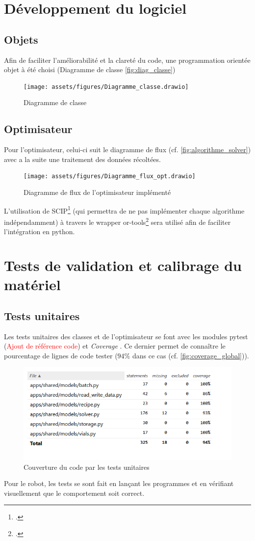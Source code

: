 \section{Développement du logiciel}
\subsection{Objets}
Afin de faciliter l'améliorabilité et la clareté du code, une programmation orientée objet à été choisi (Diagramme de classe \autoref{fig:diag_classe})
\begin{figure}[ht]
    \centering
    \texttt{[image: assets/figures/Diagramme\_classe.drawio]}
    \caption{Diagramme de classe}
    \label{fig:diag_classe}
\end{figure}
\subsection{Optimisateur}
Pour l'optimisateur, celui-ci suit le diagramme de flux (cf. \autoref{fig:algorithme_solver}) avec a la suite une traitement des données récoltées.
\begin{figure}
    \centering
    \texttt{[image: assets/figures/Diagramme\_flux\_opt.drawio]}
    \caption{Diagramme de flux de l'optimisateur implémenté}
    \label{fig:algorithme_solver}
\end{figure}
L'utilisation de SCIP\footcite{SCIP} (qui permettra de ne pas implémenter chaque algorithme indépendamment) à travers le wrapper or-tools\footcite{ORTOOLS} sera utilisé afin de faciliter l'intégration en python.

\section{Tests de validation et calibrage du matériel}
\subsection{Tests unitaires}
Les tests unitaires des classes et de l'optimisateur se font avec les modules \og pytest \fg (\textcolor{red}{Ajout de référence code}) et \og \textit{Coverage} \fg. Ce dernier permet de connaître le pourcentage de lignes de code tester ($94\%$ dans ce cas (cf. \autoref{fig:coverage_global})).
\begin{figure}[H]
    \centering
    \includegraphics[width=1\linewidth]{assets/figures/coverage.png}
    \caption{Couverture du code par les tests unitaires}
    \label{fig:coverage_global}
\end{figure}
Pour le robot, les tests se sont fait en lançant les programmes et en vérifiant visuellement que le comportement soit correct. 